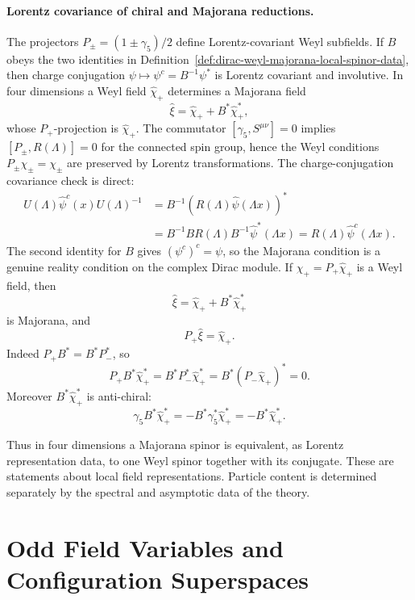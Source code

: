 \paragraph{Lorentz covariance of chiral and Majorana reductions.}
The projectors \(P_\pm=(1\pm\gamma_5)/2\) define Lorentz-covariant Weyl
subfields. If \(B\) obeys the two identities in
Definition~\ref{def:dirac-weyl-majorana-local-spinor-data}, then charge
conjugation \(\psi\mapsto\psi^c=B^{-1}\psi^*\) is Lorentz covariant and
involutive. In four dimensions a Weyl field \(\widehat\chi_+\) determines a
Majorana field
\[
  \widehat\xi
  =
  \widehat\chi_+
  +
  B^*\widehat\chi_+^*,
\]
whose \(P_+\)-projection is \(\widehat\chi_+\).
The commutator \([\gamma_5,S^{\mu\nu}]=0\) implies
\([P_\pm,R(\Lambda)]=0\) for the connected spin group, hence the Weyl
conditions \(P_\pm\chi_\pm=\chi_\pm\) are preserved by Lorentz
transformations.  The charge-conjugation covariance check is direct:
\[
\begin{aligned}
  U(\Lambda)\widehat\psi^c(x)U(\Lambda)^{-1}
  &=
  B^{-1}
  \left(R(\Lambda)\widehat\psi(\Lambda x)\right)^*      \\
  &=
  B^{-1}BR(\Lambda)B^{-1}\widehat\psi^*(\Lambda x)
   =
  R(\Lambda)\widehat\psi^c(\Lambda x).
\end{aligned}
\]
The second identity for \(B\) gives \((\psi^c)^c=\psi\), so the Majorana
condition is a genuine reality condition on the complex Dirac module.
If \(\widehat\chi_+=P_+\widehat\chi_+\) is a Weyl field, then
\[
  \widehat\xi
  =
  \widehat\chi_+
  +
  B^*\widehat\chi_+^*
\]
is Majorana, and
\[
  P_+\widehat\xi=\widehat\chi_+ .
\]
Indeed \(P_+B^*=B^*P_-^*\), so
\[
  P_+B^*\widehat\chi_+^*
  =
  B^*P_-^*\widehat\chi_+^*
  =
  B^*(P_-\widehat\chi_+)^*
  =
  0.
\]
Moreover \(B^*\widehat\chi_+^*\) is anti-chiral:
\[
  \gamma_5B^*\widehat\chi_+^*
  =
  -B^*\gamma_5^*\widehat\chi_+^*
  =
  -B^*\widehat\chi_+^* .
\]

Thus in four dimensions a Majorana spinor is equivalent, as Lorentz
representation data, to one Weyl spinor together with its conjugate. These
are statements about local field representations. Particle content is
determined separately by the spectral and asymptotic data of the theory.

\section{Odd Field Variables and Configuration Superspaces}

